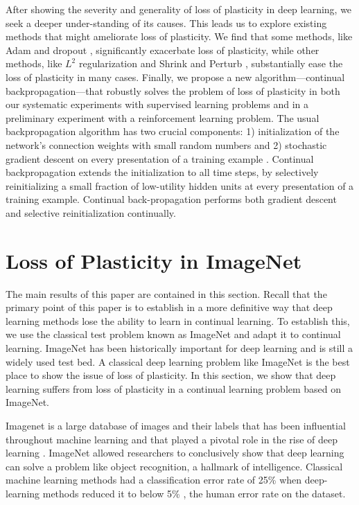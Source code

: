 \documentclass[review, number,3p]{elsarticle}
\begin{document}
After showing the severity and generality of loss of plasticity in deep learning, we seek a deeper under-standing of its causes. 
This leads us to explore existing methods that might ameliorate loss of plasticity. 
We find that some methods, like Adam \cite{kingma2015} and dropout \cite{Hinton2012Dropout1}, significantly exacerbate loss of plasticity, while other methods, like $L^2$ regularization \cite[pp.~227--230]{Goodfellow-et-al-2016} and Shrink and Perturb \cite{WarmStart2020}, substantially ease the loss of plasticity in many cases.
Finally, we propose a new algorithm---continual backpropagation---that robustly solves the problem of loss of plasticity in both our systematic experiments with supervised learning problems and in a preliminary experiment with a reinforcement learning problem. 
The usual backpropagation algorithm has two crucial components: 1) initialization of the network's connection weights with small random numbers and 2) stochastic gradient descent on every presentation of a training example \cite{rumelhart1986learning}. 
Continual backpropagation extends the initialization to all time steps, by selectively reinitializing a small fraction of low-utility hidden units at every presentation of a training example.
Continual back-propagation performs both gradient descent and selective reinitialization continually.

\section{Loss of Plasticity in ImageNet}
\label{section:loss_of_plasticity_imagenet}


The main results of this paper are contained in this section.
Recall that the primary point of this paper is to establish in a more definitive way that deep learning methods lose the ability to learn in continual learning. 
To establish this, we use the classical test problem known as ImageNet and adapt it to continual learning.
ImageNet has been historically important for deep learning and is still a widely used test bed.
A classical deep learning problem like ImageNet is the best place to show the issue of loss of plasticity.
In this section, we show that deep learning suffers from loss of plasticity in a continual learning problem based on ImageNet.

Imagenet is a large database of images and their labels that has been influential throughout machine learning \cite[Image-net.org]{deng2009}
and that played a pivotal role in the rise of deep learning 
\cite{krishevsky2012}.
ImageNet allowed researchers to conclusively show that deep learning can solve a problem like object recognition, a hallmark of intelligence.
Classical machine learning methods had a classification error rate of 25\% \cite{russakovsky2015imagenet} when
deep-learning methods reduced it to below 5\% \cite{hu2018squeeze}, the human error rate on the dataset.
\end{document}
